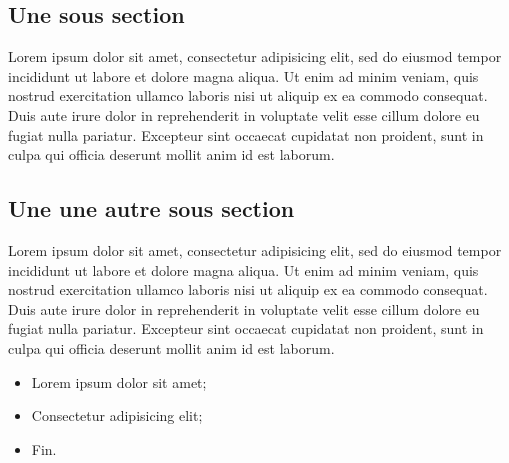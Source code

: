 \subsection{Une sous section}
Lorem ipsum dolor sit amet, consectetur adipisicing elit, sed do eiusmod
tempor incididunt ut labore et dolore magna aliqua. Ut enim ad minim veniam,
quis nostrud exercitation ullamco laboris nisi ut aliquip ex ea commodo
consequat. Duis aute irure dolor in reprehenderit in voluptate velit esse
cillum dolore eu fugiat nulla pariatur. Excepteur sint occaecat cupidatat non
proident, sunt in culpa qui officia deserunt mollit anim id est laborum.

%
\subsection{Une une autre sous section}
Lorem ipsum dolor sit amet, consectetur adipisicing elit, sed do eiusmod
tempor incididunt ut labore et dolore magna aliqua. Ut enim ad minim veniam,
quis nostrud exercitation ullamco laboris nisi ut aliquip ex ea commodo
consequat. Duis aute irure dolor in reprehenderit in voluptate velit esse
cillum dolore eu fugiat nulla pariatur. Excepteur sint occaecat cupidatat non
proident, sunt in culpa qui officia deserunt mollit anim id est laborum.


\begin{itemize}
	\item Lorem ipsum dolor sit amet;
	\item Consectetur adipisicing elit;
	\item Fin.
\end{itemize}
%
